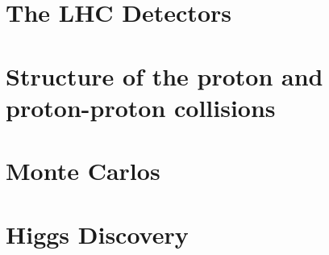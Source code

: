 \documentclass[11pt,fleqn]{book} %
\begin{document}
\chapter{The LHC Detectors}


\chapter{Structure of the proton and proton-proton collisions}


\chapter{Monte Carlos}


\chapter{Higgs Discovery}

\end{document}
